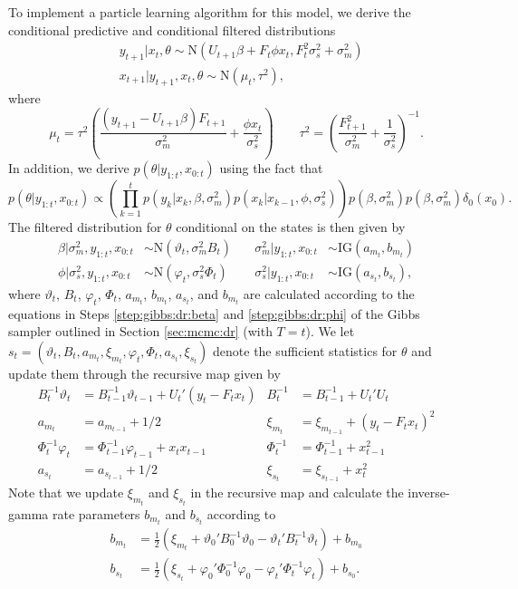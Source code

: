 To implement a particle learning algorithm for this model, we derive the conditional predictive and conditional filtered distributions
\begin{align}
&y_{t+1}|x_t,\theta \sim \mbox{N}(U_{t+1}\beta + F_t\phi x_t, F_t^2\sigma^2_s + \sigma^2_m) \label{eqn:pl:dr:pred} \\
&x_{t+1}|y_{t+1},x_t,\theta \sim \mbox{N}(\mu_t,\tau^2), \label{eqn:pl:dr:state}
\end{align}
where \[\mu_t = \tau^2\left(\frac{(y_{t+1}-U_{t+1}\beta)F_{t+1}}{\sigma^2_m} + \frac{\phi x_t}{\sigma^2_s}\right) \qquad \tau^2 = \left(\frac{F_{t+1}^2}{\sigma^2_m} + \frac{1}{\sigma^2_s}\right)^{-1}.\]
In addition, we derive $p(\theta|y_{1:t},x_{0:t})$ using the fact that
\begin{equation}
p(\theta|y_{1:t},x_{0:t}) \propto \left(\prod_{k=1}^t p(y_k|x_k,\beta,\sigma^2_m)p(x_k|x_{k-1},\phi,\sigma^2_s)\right)p(\beta,\sigma^2_m)p(\beta,\sigma^2_m)\delta_0(x_0). \label{eqn:pl:dr:theta}
\end{equation}
The filtered distribution for $\theta$ conditional on the states is then given by
\begin{align}
\beta|\sigma^2_m,y_{1:t},x_{0:t} &\sim \mbox{N}(\vartheta_t, \sigma^2_m B_t) &\quad \sigma^2_m|y_{1:t},x_{0:t} &\sim \mbox{IG}(a_{m_t},b_{m_t}) \label{eqn:pl:post:beta} \\
\phi|\sigma^2_s,y_{1:t},x_{0:t} &\sim \mbox{N}(\varphi_t, \sigma^2_s \Phi_t) &\quad \sigma^2_s|y_{1:t},x_{0:t} &\sim \mbox{IG}(a_{s_t},b_{s_t}), \label{eqn:pl:post:phi}
\end{align}
where $\vartheta_t$, $B_t$, $\varphi_t$, $\Phi_t$, $a_{m_t}$, $b_{m_t}$, $a_{s_t}$, and $b_{m_t}$ are calculated according to the equations in Steps \ref{step:gibbs:dr:beta} and \ref{step:gibbs:dr:phi} of the Gibbs sampler outlined in Section \ref{sec:mcmc:dr} (with $T = t$). We let $s_t = (\vartheta_t, B_t, a_{m_t}, \xi_{m_t}, \varphi_t, \Phi_t, a_{s_t}, \xi_{s_t})$ denote the sufficient statistics for $\theta$ and update them through the recursive map given by
\begin{align}
B_t^{-1}\vartheta_t &= B_{t-1}^{-1}\vartheta_{t-1} + U_t'(y_t - F_tx_t) & B_t^{-1} &= B_{t-1}^{-1} + U_t'U_t \label{eqn:pl:dr:suff} \\
a_{m_t} &= a_{m_{t-1}} + 1/2 & \xi_{m_t} &= \xi_{m_{t-1}} + (y_t - F_tx_t)^2 \nonumber \\
\Phi_t^{-1}\varphi_t &= \Phi_{t-1}^{-1}\varphi_{t-1} + x_tx_{t-1} & \Phi_t^{-1} &= \Phi_{t-1}^{-1} + x_{t-1}^2 \nonumber \\
a_{s_t} &= a_{s_{t-1}} + 1/2 & \xi_{s_t} &= \xi_{s_{t-1}} + x_t^2 \nonumber
\end{align}
Note that we update $\xi_{m_t}$ and $\xi_{s_t}$ in the recursive map and calculate the inverse-gamma rate parameters $b_{m_t}$ and $b_{s_t}$ according to
\begin{align}
b_{m_t} &= \frac{1}{2}\left(\xi_{m_t} + \vartheta_0'B_0^{-1}\vartheta_0 - \vartheta_t'B_t^{-1}\vartheta_t\right) + b_{m_0} \label{eqn:pl:dr:rate} \\
b_{s_t} &= \frac{1}{2}\left(\xi_{s_t} + \varphi_0'\Phi_0^{-1}\varphi_0 - \varphi_t'\Phi_t^{-1}\varphi_t\right) + b_{s_0}. \nonumber
\end{align}


